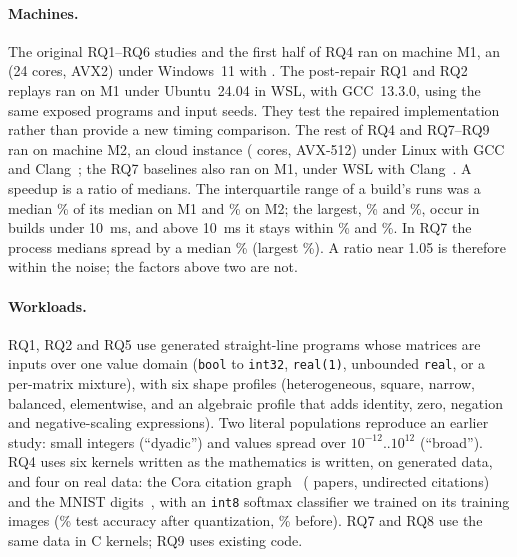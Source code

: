 \documentclass[acmsmall,review,anonymous,nonacm]{acmart}
\begin{document}
\paragraph{Machines.} The original RQ1--RQ6 studies and the first half of RQ4 ran on machine M1, an
\PlatCpuFirstGcc{} (24 cores, AVX2) under Windows~11 with \PlatCcFirstGcc{}.
The post-repair RQ1 and RQ2 replays ran on M1 under Ubuntu~24.04 in WSL,
with GCC~13.3.0, using the same exposed programs and input seeds. They test
the repaired implementation rather than provide a new timing comparison.
The rest of RQ4 and RQ7--RQ9 ran on machine M2, an \LlvmCpu{} cloud instance
(\LlvmCores{} cores, AVX-512) under Linux with GCC~\LlvmGcc{} and
Clang~\LlvmClang{}; the RQ7 baselines also ran on M1, under WSL with
Clang~\BaseClang. A speedup is a ratio of medians. The interquartile range of
a build's runs was a median \SpreadFirstMedian\% of its median on M1 and
\SpreadSecondMedian\% on M2; the largest, \SpreadFirstMax\% and
\SpreadSecondMax\%, occur in builds under 10~ms, and above 10~ms it stays within
\SpreadFirstMaxLong\% and \SpreadSecondMaxLong\%. In RQ7 the process medians
spread by a median \SpreadLlvmMedian\% (largest \SpreadLlvmMax\%). A ratio near
1.05 is therefore within the noise; the factors above two are not.

\paragraph{Workloads.} RQ1, RQ2 and RQ5 use generated straight-line programs
whose matrices are inputs over one value domain (\texttt{bool} to
\texttt{int32}, \texttt{real(1)}, unbounded \texttt{real}, or a per-matrix
mixture), with six shape profiles (heterogeneous, square, narrow, balanced,
elementwise, and an algebraic profile that adds identity, zero, negation and
negative-scaling expressions). Two literal populations reproduce an earlier
study: small integers (``dyadic'') and values spread over $10^{-12}$..$10^{12}$
(``broad''). RQ4 uses six kernels written as the mathematics is written, on
generated data, and four on real data: the Cora citation
graph~\cite{cora} (\LlvmDataCoraVertices{} papers, \LlvmDataCoraEdges{}
undirected citations) and the MNIST
digits~\cite{mnist}, with an \texttt{int8} softmax classifier we trained on its
training images (\LlvmDataMnistAccuracy\% test accuracy after quantization,
\LlvmDataMnistFloatAccuracy\% before). RQ7 and RQ8 use the same data in C
kernels; RQ9 uses existing code.
\end{document}
